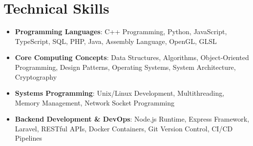 \documentclass[letterpaper,11pt]{article}
\newcommand{\resumeSubHeadingListStart}{\begin{itemize}[leftmargin=*]}
\newcommand{\resumeSubHeadingListEnd}{\end{itemize}}
\begin{document}
\section{Technical Skills}
 \resumeSubHeadingListStart
    \item{\textbf{Programming Languages}{: C++ Programming, Python, JavaScript, TypeScript, SQL, PHP, Java, Assembly Language, OpenGL, GLSL}}
    \item{\textbf{Core Computing Concepts}{: Data Structures, Algorithms, Object-Oriented Programming, Design Patterns, Operating Systems, System Architecture, Cryptography}}
    \item{\textbf{Systems Programming}{: Unix/Linux Development, Multithreading, Memory Management, Network Socket Programming}}
    \item{\textbf{Backend Development \& DevOps}{: Node.js Runtime, Express Framework, Laravel, RESTful APIs, Docker Containers, Git Version Control, CI/CD Pipelines}}
 \resumeSubHeadingListEnd
 \vspace{-2pt}
\end{document}
